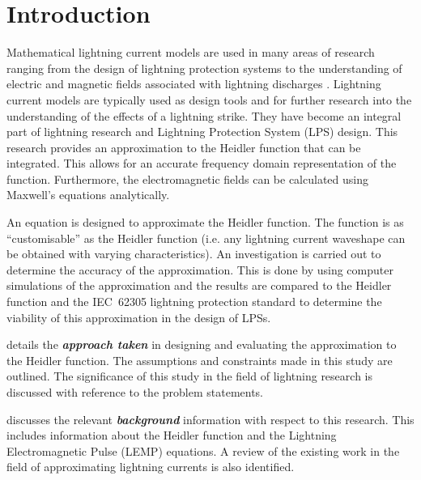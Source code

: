 
\chapter{Introduction} %

\label{ChapterIntro} %


Mathematical lightning current models are used in many areas of research ranging from the design of lightning protection systems to the understanding of electric and magnetic fields associated with lightning discharges \cite{IEC623051, ZhangFeizhouandLiuShanghe2002}.
Lightning current models are typically used as design tools and for further research into the understanding of the effects of a lightning strike.
They have become an integral part of lightning research and Lightning Protection System (LPS) design.
This research provides an approximation to the Heidler function that can be integrated. This allows for an accurate frequency domain representation of the function. Furthermore, the electromagnetic fields can be calculated using Maxwell's equations analytically.

An equation is designed to approximate the Heidler function. The function is as ``customisable'' as the Heidler function (i.e. any lightning current waveshape can be obtained with varying characteristics).
An investigation is carried out to determine the accuracy of the approximation. This is done by using computer simulations of the approximation and the results are compared to the Heidler function and the IEC~62305 lightning protection standard to determine the viability of this approximation in the design of LPSs.

 details the \textbf{\textit{approach taken}} in designing and evaluating the approximation to the Heidler function. The assumptions and constraints made in this study are outlined. The significance of this study in the field of lightning research is discussed with reference to the problem statements.

 discusses the relevant \textbf{\textit{background}} information with respect to this research. This includes information about the Heidler function and the Lightning Electromagnetic Pulse (LEMP) equations. A review of the existing work in the field of approximating lightning currents is also identified.

